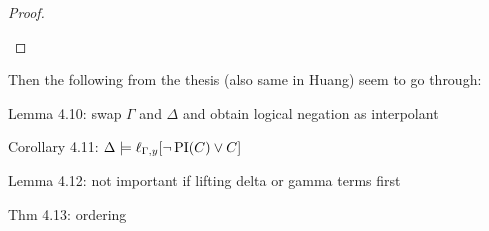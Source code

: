 \documentclass[,%
	paper=a4,%
	DIV14, 
	liststotoc,
	bibtotoc,
	draft=false,%
	numbers=noendperiod
]{scrartcl}
\newcommand{\lif}[1]{\lift{\Delta}{#1}{x}}
\begin{document}
\begin{proof}
\begin{description}
\begin{comment}
			By induction hypothesis (and lemma 11 (huang) and adding the substitution $\sigma'$), 
			$\Gamma \entails \lif{\PI(C_2)}\sigma' \lor \lif{(E[r])}\sigma'$.

			However by assumption $\Gamma \not \entails \lif{E[t]}\sigma'$.

			Hence $\Gamma \not \entails \lif{E[s]}\sigma'$, and
			$\Gamma \not \entails \lif{E[r]}\sigma'$. Therefore $\Gamma \entails \lif{\PI(C_2)}\sigma'$.


			Suppose on the other hand $M \entails \lif{s}\sigma' \neq \lif{t}\sigma'$.

			By the induction hypothesis, 
			$M \entails \lif{\PI(C_1)}\sigma' \lor (\lif{D}\sigma'\lor (\lif{s}=\lif{t})\sigma')$,
			hence then $M \entails \lif{\PI(C_1)}\sigma'$.

			Consequently, 
			$M \entails (\lif{s}\sigma' \neq \lif{t}\sigma' \land \lif{\PI(C_1)}\sigma') \lor (\lif{s}\sigma' = \lif{t}\sigma' \land \lif{\PI(C_2)}\sigma')$.

			By lemma 11 (huang), 
			$M \entails \lif{s \neq {t} \land {\PI(C_1)} \lor ({s} = {t} \land \PI(C_2))}\sigma'$.

			Hence 
			$\Gamma \entails \lif{(s \neq {t} \land {\PI(C_1)} \lor ({s} = {t} \land \PI(C_2))}\sigma' \lor (\lif{D} \lor \lif{E[t]})\sigma') $.

			is this really what i need to show?
		\end{comment}
\end{description}
\end{proof}



Then the following from the thesis (also same in Huang) seem to go through:

Lemma 4.10: swap $\Gamma$ and $\Delta$ and obtain logical negation as interpolant 

Corollary 4.11: $\Delta \models \ell_{\Gamma,y}[ \lnot \operatorname{PI}(C) \lor C]$ 

Lemma 4.12: not important if lifting delta or gamma terms first 

Thm 4.13: ordering 
\end{document}
